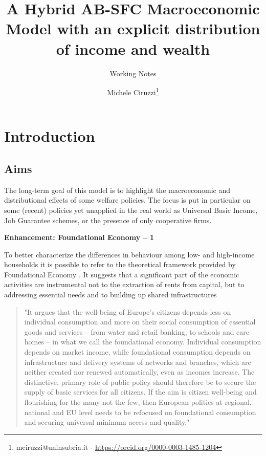\documentclass[a4paper, headings=standardclasses]{scrartcl}
\title{A Hybrid AB-SFC Macroeconomic Model with an explicit distribution of income and wealth \let\thefootnote\relax\footnotetext{
	An updated version of this paper and all the source code and the instructions required to replicate the paper are available at \url{https://github.com/TnTo/FE/}

	\hl{Highlighted} parts of the text indicate substantial choices to be taken.
  }}
\subtitle{Working Notes}
\author{Michele Ciruzzi\thanks{mciruzzi@uninsubria.it - \url{https://orcid.org/0000-0003-1485-1204}}}
\newenvironment{enh}[1][]{\begin{framed}\noindent\textbf{Enhancement: #1}\par}{\end{framed}}
\begin{document}
\maketitle


\section{Introduction}
\subsection{Aims}
The long-term goal of this model is to highlight the macroeconomic and distributional effects of some welfare policies.
The focus is put in particular on some (recent) policies yet unapplied in the real world as Universal Basic Income, Job Guarantee schemes, or the presence of only cooperative firms.

\begin{enh}[Foundational Economy -- 1]
	To better characterize the differences in behaviour among low- and high-income households it is possible to refer to the theoretical framework provided by Foundational Economy \parencite{arcidiacono2018}. It suggests that a significant part of the economic activities are instrumental not to the extraction of rents from capital, but to addressing essential needs and to building up shared infrastructures
	\begin{quote}
		"It argues that the well-being of Europe's citizens depends less on individual consumption and more on their social consumption of essential goods and services – from water and retail banking, to schools and care homes – in what we call the foundational economy. Individual consumption depends on market income, while foundational consumption depends on infrastructure and delivery systems of networks and branches, which are neither created nor renewed automatically, even as incomes increase. The distinctive, primary role of public policy should therefore be to secure the supply of basic services for all citizens. If the aim is citizen well-being and flourishing for the many not the few, then European politics at regional, national and EU level needs to be refocused on foundational consumption and securing universal minimum access and quality." \parencite{arcidiacono2018}
	\end{quote}
\end{enh}
\end{document}
